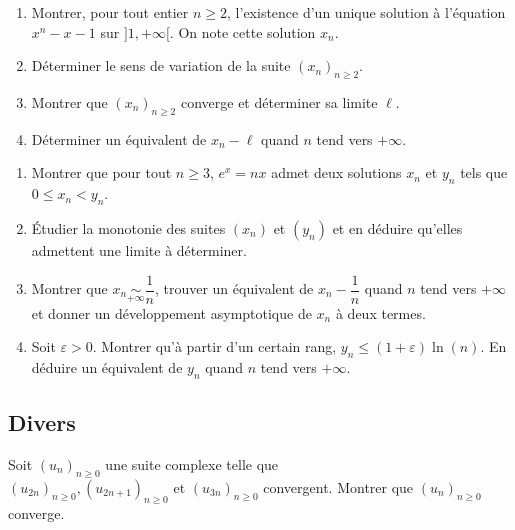 \documentclass[a4paper,twoside,french,11pt]{VcCours}
\begin{document}
\begin{Exercice}
\begin{enumerate}
\item Montrer, pour tout entier $n \geq 2$,  l'existence d'un unique solution à l'équation $x^n-x-1$ sur $]1, + \infty[$. On note cette solution $x_n$.
\item Déterminer le sens de variation de la suite $(x_n)_{n \geq 2}$.
\item Montrer que  $(x_n)_{n \geq 2}$ converge et déterminer sa limite $\ell$.
\item Déterminer un équivalent de $x_n - \ell$ quand $n$ tend vers $+ \infty$.
\end{enumerate}
\end{Exercice}


\begin{Exercice}[$\bigstar$]
\begin{enumerate}
\item Montrer que pour tout $n \geq 3$, $e^x=nx$ admet deux solutions $x_n$ et 
$y_n$ tels que $0 \leq x_n <y_n$.
\item Étudier la monotonie des suites $(x_n)$ et $(y_n)$ et en déduire qu'elles 
admettent une limite à déterminer.
\item Montrer que $x_n \underset{+ \infty}{\sim} \dfrac{1}{n}$, trouver un 
équivalent de $x_n - \dfrac{1}{n}$ quand $n$ tend vers $+ \infty$ et donner un 
développement asymptotique de $x_n$ à deux termes.
\item Soit $\varepsilon >0$. Montrer qu'à partir d'un certain rang, 
$y_n \leq (1+ \varepsilon) \ln(n)$. En déduire un équivalent de $y_n$ 
quand $n$ tend vers $+ \infty$.
\end{enumerate}
\end{Exercice}



\subsection{Divers}

\begin{Exercice} Soit $(u_n)_{n \geq 0}$ une suite complexe telle que $(u_{2n})_{n \geq 0},(u_{2n + 1})_{n \geq 0}{\text{ et }}(u_{3n})_{n \geq 0}$ convergent. Montrer que $(u_n)_{n \geq 0}$ converge.
\end{Exercice} 
\end{document}
